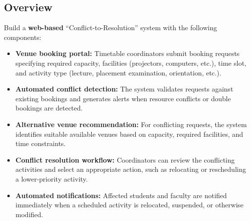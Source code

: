 \documentclass[11pt,a4paper]{article}
\begin{document}
\subsection{Overview}
Build a \textbf{web-based} “Conflict-to-Resolution” system with the following components:
\begin{itemize}[leftmargin=0.7cm]
    \item \textbf{Venue booking portal:} Timetable coordinators submit booking requests specifying required capacity, facilities (projectors, computers, etc.), time slot, and activity type (lecture, placement examination, orientation, etc.).
    \item \textbf{Automated conflict detection:} The system validates requests against existing bookings and generates alerts when resource conflicts or double bookings are detected.
    \item \textbf{Alternative venue recommendation:} For conflicting requests, the system identifies suitable available venues based on capacity, required facilities, and time constraints.
    \item \textbf{Conflict resolution workflow:} Coordinators can review the conflicting activities and select an appropriate action, such as relocating or rescheduling a lower-priority activity.
    \item \textbf{Automated notifications:} Affected students and faculty are notified immediately when a scheduled activity is relocated, suspended, or otherwise modified.
\end{itemize}
\end{document}
